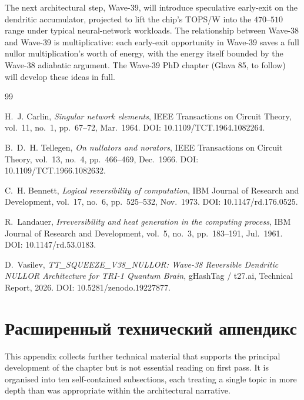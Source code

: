 The next architectural step, Wave-39, will introduce speculative early-exit on
the dendritic accumulator, projected to lift the chip's TOPS/W into the
$470$--$510$ range under typical neural-network workloads.  The relationship
between Wave-38 and Wave-39 is multiplicative: each early-exit opportunity in
Wave-39 saves a full nullor multiplication's worth of energy, with the energy
itself bounded by the Wave-38 adiabatic argument.  The Wave-39 PhD chapter
(Glava 85, to follow) will develop these ideas in full.

\begin{thebibliography}{99}

H.~J. Carlin,
\emph{Singular network elements},
IEEE Transactions on Circuit Theory, vol.~11, no.~1, pp.~67--72, Mar.~1964.
DOI: 10.1109/TCT.1964.1082264.

B.~D.~H. Tellegen,
\emph{On nullators and norators},
IEEE Transactions on Circuit Theory, vol.~13, no.~4, pp.~466--469, Dec.~1966.
DOI: 10.1109/TCT.1966.1082632.

C.~H. Bennett,
\emph{Logical reversibility of computation},
IBM Journal of Research and Development, vol.~17, no.~6, pp.~525--532, Nov.~1973.
DOI: 10.1147/rd.176.0525.

R.~Landauer,
\emph{Irreversibility and heat generation in the computing process},
IBM Journal of Research and Development, vol.~5, no.~3, pp.~183--191, Jul.~1961.
DOI: 10.1147/rd.53.0183.

D.~Vasilev,
\emph{TT\_SQUEEZE\_V38\_NULLOR: Wave-38 Reversible Dendritic NULLOR Architecture
for TRI-1 Quantum Brain},
gHashTag / t27.ai, Technical Report, 2026.
DOI: 10.5281/zenodo.19227877.

\end{thebibliography}


\section{Расширенный технический аппендикс}
\label{sec:extended_appendix}

This appendix collects further technical material that supports the principal
development of the chapter but is not essential reading on first pass.  It is
organised into ten self-contained subsections, each treating a single topic in
more depth than was appropriate within the architectural narrative.


